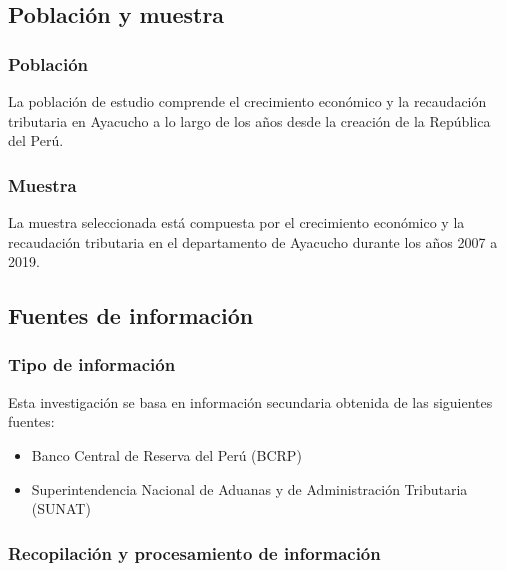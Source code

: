 \documentclass[
  letterpaper,
  DIV=11,
  numbers=noendperiod]{scrartcl}
\begin{document}
\hypertarget{sec-poblaciuxf3n-y-muestra}{%
\subsection{Población y muestra}\label{sec-poblaciuxf3n-y-muestra}}

\hypertarget{poblaciuxf3n}{%
\subsubsection{Población}\label{poblaciuxf3n}}

La población de estudio comprende el crecimiento económico y la
recaudación tributaria en Ayacucho a lo largo de los años desde la
creación de la República del Perú.

\hypertarget{muestra}{%
\subsubsection{Muestra}\label{muestra}}

La muestra seleccionada está compuesta por el crecimiento económico y la
recaudación tributaria en el departamento de Ayacucho durante los años
2007 a 2019.

\hypertarget{sec-fuentes-de-informaciuxf3n}{%
\subsection{Fuentes de
información}\label{sec-fuentes-de-informaciuxf3n}}

\hypertarget{tipo-de-informaciuxf3n}{%
\subsubsection{Tipo de información}\label{tipo-de-informaciuxf3n}}

Esta investigación se basa en información secundaria obtenida de las
siguientes fuentes:

\begin{itemize}
\item
  Banco Central de Reserva del Perú (BCRP)
\item
  Superintendencia Nacional de Aduanas y de Administración Tributaria
  (SUNAT)
\end{itemize}

\hypertarget{recopilaciuxf3n-y-procesamiento-de-informaciuxf3n}{%
\subsubsection{Recopilación y procesamiento de
información}\label{recopilaciuxf3n-y-procesamiento-de-informaciuxf3n}}
\end{document}
